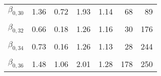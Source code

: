 \begin{table}
\begin{tabular}[t]{lrrrrrr}
$\beta_{0, 30}$ & 1.36 & 0.72 & 1.93 & 1.14 & 68 & 89\\
\cellcolor{gray!6}{$\beta_{0, 31}$} & \cellcolor{gray!6}{0.58} & \cellcolor{gray!6}{-0.13} & \cellcolor{gray!6}{1.18} & \cellcolor{gray!6}{1.25} & \cellcolor{gray!6}{17} & \cellcolor{gray!6}{6}\\
$\beta_{0, 32}$ & 0.66 & 0.18 & 1.26 & 1.16 & 30 & 176\\
\cellcolor{gray!6}{$\beta_{0, 33}$} & \cellcolor{gray!6}{0.63} & \cellcolor{gray!6}{0.12} & \cellcolor{gray!6}{1.15} & \cellcolor{gray!6}{1.25} & \cellcolor{gray!6}{15} & \cellcolor{gray!6}{103}\\
$\beta_{0, 34}$ & 0.73 & 0.16 & 1.26 & 1.13 & 28 & 244\\
\cellcolor{gray!6}{$\beta_{0, 35}$} & \cellcolor{gray!6}{1.99} & \cellcolor{gray!6}{1.54} & \cellcolor{gray!6}{2.46} & \cellcolor{gray!6}{1.11} & \cellcolor{gray!6}{59} & \cellcolor{gray!6}{408}\\
$\beta_{0, 36}$ & 1.48 & 1.06 & 2.01 & 1.28 & 178 & 250\\
\bottomrule
\end{tabular}
\end{table}